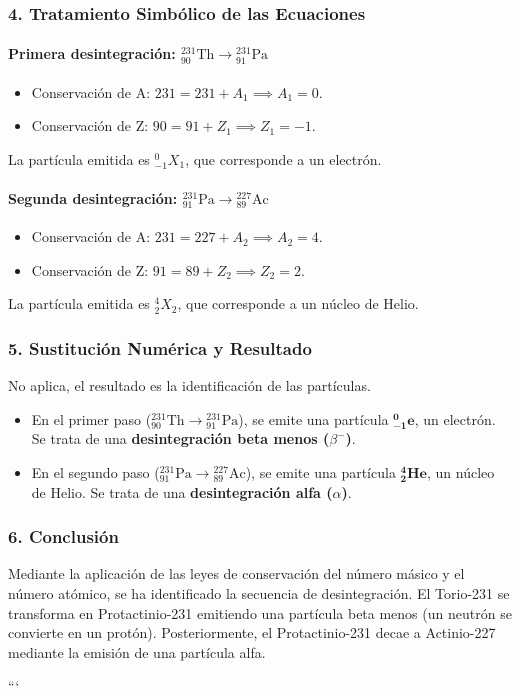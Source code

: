 \subsubsection*{4. Tratamiento Simbólico de las Ecuaciones}
\paragraph{Primera desintegración: ${}_{90}^{231}\text{Th} \to {}_{91}^{231}\text{Pa}$}
\begin{itemize}
    \item Conservación de A: $231 = 231 + A_1 \implies A_1 = 0$.
    \item Conservación de Z: $90 = 91 + Z_1 \implies Z_1 = -1$.
\end{itemize}
La partícula emitida es ${}_{-1}^{0}X_1$, que corresponde a un electrón.

\paragraph{Segunda desintegración: ${}_{91}^{231}\text{Pa} \to {}_{89}^{227}\text{Ac}$}
\begin{itemize}
    \item Conservación de A: $231 = 227 + A_2 \implies A_2 = 4$.
    \item Conservación de Z: $91 = 89 + Z_2 \implies Z_2 = 2$.
\end{itemize}
La partícula emitida es ${}_{2}^{4}X_2$, que corresponde a un núcleo de Helio.

\subsubsection*{5. Sustitución Numérica y Resultado}
No aplica, el resultado es la identificación de las partículas.
\begin{cajaresultado}
\begin{itemize}
    \item En el primer paso (${}_{90}^{231}\text{Th} \to {}_{91}^{231}\text{Pa}$), se emite una partícula $\boldsymbol{{}_{-1}^{0}\text{e}}$, un electrón. Se trata de una \textbf{desintegración beta menos ($\beta^-$)}.
    \item En el segundo paso (${}_{91}^{231}\text{Pa} \to {}_{89}^{227}\text{Ac}$), se emite una partícula $\boldsymbol{{}_{2}^{4}\text{He}}$, un núcleo de Helio. Se trata de una \textbf{desintegración alfa ($\alpha$)}.
\end{itemize}
\end{cajaresultado}

\subsubsection*{6. Conclusión}
\begin{cajaconclusion}
Mediante la aplicación de las leyes de conservación del número másico y el número atómico, se ha identificado la secuencia de desintegración. El Torio-231 se transforma en Protactinio-231 emitiendo una partícula beta menos (un neutrón se convierte en un protón). Posteriormente, el Protactinio-231 decae a Actinio-227 mediante la emisión de una partícula alfa.
\end{cajaconclusion}
\newpage
```
